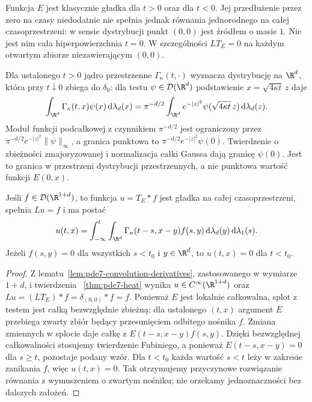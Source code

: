 \begin{uwaga}[Nie jest to rozwiązanie klasyczne w $t=0$]
Funkcja $E$ jest klasycznie gładka dla $t>0$ oraz
dla $t<0$. Jej przedłużenie przez zero na czasy
niedodatnie nie spełnia jednak równania jednorodnego
na całej czasoprzestrzeni: w sensie dystrybucji
punkt $(0,0)$ jest źródłem o masie $1$.
Nie jest nim cała hiperpowierzchnia $t=0$.
W szczególności $LT_E=0$ na każdym otwartym
zbiorze niezawierającym $(0,0)$.

Dla ustalonego $t>0$ jądro przestrzenne
$\Gamma_\kappa(t,\cdot)$ wyznacza dystrybucję na
$\R^d$, która przy $t\downarrow0$ zbiega do
$\delta_0$: dla testu $\psi\in\mathcal D(\R^d)$
podstawienie $x=\sqrt{4\kappa t}\,z$ daje
\[
 \int_{\R^d}\Gamma_\kappa(t,x)\psi(x)\,\mathrm d\lambda_d(x)
 =\pi^{-d/2}\int_{\R^d}e^{-|z|^2}
 \psi(\sqrt{4\kappa t}\,z)\,\mathrm d\lambda_d(z).
\]
Moduł funkcji podcałkowej z czynnikiem
$\pi^{-d/2}$ jest ograniczony przez
$\pi^{-d/2}e^{-|z|^2}\|\psi\|_\infty$,
a granica punktowa to
$\pi^{-d/2}e^{-|z|^2}\psi(0)$.
Twierdzenie o zbieżności zmajoryzowanej
i normalizacja całki Gaussa dają granicę $\psi(0)$.
Jest to granica w przestrzeni dystrybucji
przestrzennych, a nie punktowa wartość funkcji
$E(0,x)$.
\end{uwaga}

\begin{wniosek}
Jeśli $f\in\mathcal D(\R^{1+d})$, to funkcja
$u=T_E*f$ jest gładka na całej czasoprzestrzeni,
spełnia $Lu=f$ i ma postać
\[
 u(t,x)=\int_{-\infty}^t\int_{\R^d}
 \Gamma_\kappa(t-s,x-y)f(s,y)
 \,\mathrm d\lambda_d(y)\,\mathrm d\lambda_1(s).
\]
Jeżeli $f(s,y)=0$ dla wszystkich $s<t_0$ i $y\in\R^d$,
to $u(t,x)=0$ dla $t<t_0$.
\end{wniosek}
\begin{proof}
Z lematu~\ref{lem:pde7-convolution-derivatives},
zastosowanego w wymiarze $1+d$, i twierdzenia
~\ref{thm:pde7-heat} wynika
$u\in C^\infty(\R^{1+d})$ oraz
$Lu=(LT_E)*f=\delta_{(0,0)}*f=f$.
Ponieważ $E$ jest lokalnie całkowalna, splot
z testem jest całką bezwzględnie zbieżną:
dla ustalonego $(t,x)$ argument $E$ przebiega
zwarty zbiór będący przesunięciem odbitego
nośnika $f$. Zmiana zmiennych w splocie daje
całkę z $E(t-s,x-y)f(s,y)$.
Dzięki bezwzględnej całkowalności stosujemy
twierdzenie Fubiniego, a ponieważ $E(t-s,x-y)=0$
dla $s\ge t$, pozostaje podany wzór.
Dla $t<t_0$ każda wartość $s<t$ leży w zakresie
zanikania $f$, więc $u(t,x)=0$.
Tak otrzymujemy przyczynowe rozwiązanie równania
z wymuszeniem o zwartym nośniku; nie orzekamy
jednoznaczności bez dalszych założeń.
\end{proof}

